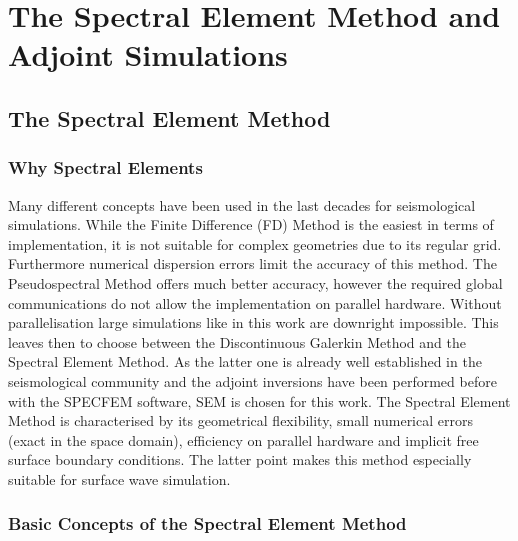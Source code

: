 
\chapter{The Spectral Element Method and Adjoint Simulations}


\section{The Spectral Element Method}

\subsection{Why Spectral Elements}

Many different concepts have been used in the last decades for seismological simulations. 
While the Finite Difference (FD) Method is the easiest in terms of implementation, it is not suitable for 
complex geometries due to its regular grid. %
Furthermore numerical dispersion errors limit the accuracy of this method.
The Pseudospectral Method offers much better accuracy, however the required global communications do not allow the 
implementation on parallel hardware. Without parallelisation large simulations like in this work are downright impossible.
This leaves then to choose between the Discontinuous Galerkin Method and the Spectral Element Method. As the latter one 
is already well established in the seismological community and the adjoint inversions have been performed before with the
SPECFEM software, SEM is chosen for this work. 
The Spectral Element Method is characterised by its geometrical flexibility, small numerical errors (exact in the space domain), 
efficiency on parallel hardware and implicit free surface boundary conditions. 
The latter point makes this method especially suitable for surface wave simulation. %

\subsection{Basic Concepts of the Spectral Element Method}

